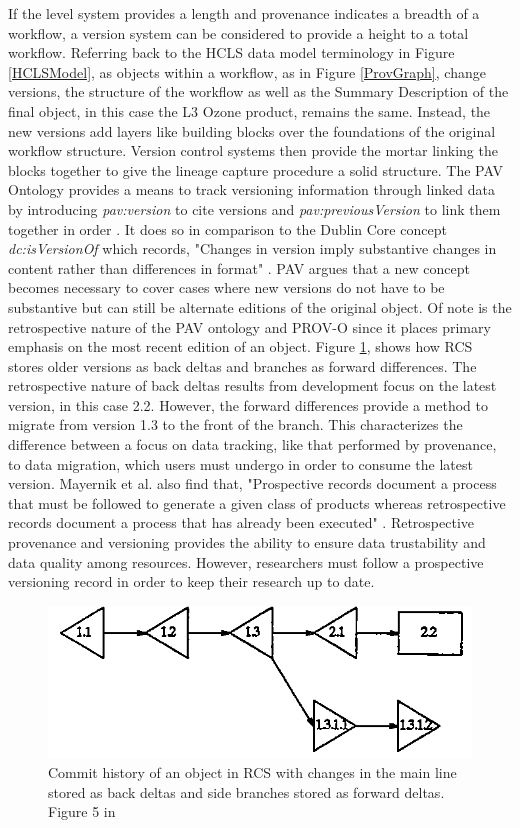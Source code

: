 If the level system provides a length and provenance indicates a breadth of a workflow, a version system can be considered to provide a height to a total workflow.
Referring back to the HCLS data model terminology in Figure \ref{HCLSModel}, as objects within a workflow, as in Figure \ref{ProvGraph}, change versions, the structure of the workflow as well as the Summary Description of the final object, in this case the L3 Ozone product, remains the same.
Instead, the new versions add layers like building blocks over the foundations of the original workflow structure.
Version control systems then provide the mortar linking the blocks together to give the lineage capture procedure a solid structure.
The PAV Ontology provides a means to track versioning information through linked data by introducing \textit{pav:version} to cite versions and \textit{pav:previousVersion} to link them together in order \cite{Ciccarese2013}.
It does so in comparison to the Dublin Core concept \textit{dc:isVersionOf} which records, "Changes in version imply substantive changes in content rather than differences in format" \cite{DCMI2012}.
PAV argues that a new concept becomes necessary to cover cases where new versions do not have to be substantive but can still be alternate editions of the original object.
Of note is the retrospective nature of the PAV ontology and PROV-O since it places primary emphasis on the most recent edition of an object.
Figure \ref{RCSTree}, shows how RCS stores older versions as back deltas and branches as forward differences.
The retrospective nature of back deltas results from development focus on the latest version, in this case 2.2.
However, the forward differences provide a method to migrate from version 1.3 to the front of the branch.
This characterizes the difference between a focus on data tracking, like that performed by provenance, to data migration, which users must undergo in order to consume the latest version.
Mayernik et al. also find that, "Prospective records document a process that must be followed to generate a given class of products whereas retrospective records document a process that has already been executed" \cite{MatthewS.Mayernik201312-039}.
Retrospective provenance and versioning provides the ability to ensure data trustability and data quality among resources.
However, researchers must follow a prospective versioning record in order to keep their research up to date.

\begin{figure}[b]
	\centering
	\includegraphics[scale=0.75]{figures/RCSCommitTree.png}
	\caption{Commit history of an object in RCS with changes in the main line stored as back deltas and side branches stored as forward deltas.  Figure 5 in \cite{tichy1985rcs}}
	\label{RCSTree}
\end{figure}

